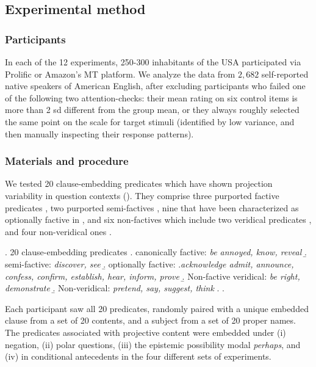 \documentclass[a4paper,12pt,twoside]{article}
\begin{document}
	\subsection{Experimental method}

		\subsubsection{Participants}
			In each of the 12 experiments, 250-300 inhabitants of the USA participated via Prolific or Amazon's MT platform. 
			We analyze the data from $2,682$ self-reported native speakers of American English, after excluding participants who failed one of the following two attention-checks: their mean rating on six control items is more than 2 sd different from the group mean, or they always roughly selected the same point on the scale for target stimuli (identified by low variance, and then manually inspecting their response patterns).

		\subsubsection{Materials and procedure }
			We tested 20 clause-embedding predicates \Next which have shown projection variability in question contexts (\citealt{degen_are_2022}). They comprise three purported factive predicates \Next[a], two purported semi-factives \Next[b], nine that have been characterized as optionally factive in \citealt{kiparsky_fact_1970} \Next[c], and six non-factives which include two veridical predicates \Next[d], and four non-veridical ones \Next[e].

			\ex. 20 clause-embedding predicates \hfill \citealt{degen_are_2022}
				\a. canonically factive:
					\hfill \emph{be annoyed, know, reveal}
				\b. semi-factive:
					\hfill \emph{discover, see}
				\b. optionally factive: \newline
					\phantom.\hfill \emph{acknowledge admit, announce, confess, confirm, establish, hear, inform, prove}
				\b. Non-factive veridical:
					\hfill \emph{be right, demonstrate}
				\b. Non-veridical:
					\hfill \emph{pretend, say, suggest, think}
				\z.
			\z.

			Each participant saw all 20 predicates, randomly paired with a unique embedded clause from a set of 20 contents, and a subject from a set of 20 proper names. The predicates associated with projective content were embedded under (i) negation, (ii) polar questions, (iii) the epistemic possibility modal \textit{perhaps}, and (iv) in conditional antecedents in the four different sets of experiments.
\end{document}
